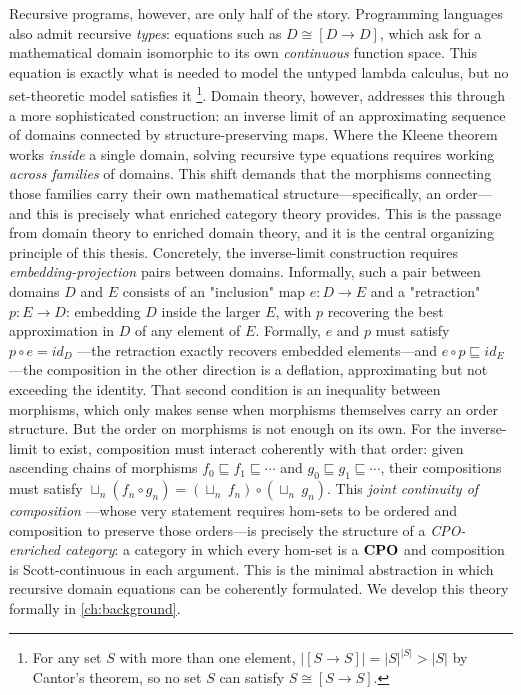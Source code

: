 Recursive programs, however, are only half of the story. Programming languages also admit recursive \textit{types}:
equations such as $D \cong [D \to D]$, which ask for a mathematical domain isomorphic to its own \textit{continuous}
function space. This equation is exactly what is needed to model the untyped lambda calculus, but no set-theoretic model satisfies it
\footnote{For any set $S$ with more than one element, $\left|[S \to S]\right| = |S|^{|S|} > |S|$ by Cantor's theorem, 
so no set $S$ can satisfy $S \cong [S \to S]$.}.
Domain theory, however, addresses this through a more
sophisticated construction: an inverse limit of an approximating sequence of 
domains connected by structure-preserving maps. Where the Kleene theorem works \textit{inside} a single domain, solving
recursive type equations requires working \textit{across families} of domains. This shift demands that the morphisms 
connecting those families carry their own mathematical structure---specifically, an order---and this is precisely what 
enriched category theory provides. This is the passage from domain theory to enriched domain theory, and it is the central 
organizing principle of this thesis. Concretely, the inverse-limit construction requires
\textit{embedding-projection} pairs between domains. Informally, such a pair between domains $D$ and $E$ consists of
an "inclusion" map $e : D \to E$ and a "retraction" $p : E \to D$: embedding $D$ inside the larger $E$, 
with $p$ recovering the best approximation in $D$ of any element of $E$. Formally, $e$ and $p$ must satisfy $p \circ e = id_{D}$ 
---the retraction exactly recovers embedded elements---and $e \circ p \sqsubseteq id_{E}$---the composition in the other 
direction is a deflation, approximating but not exceeding the identity. That second condition is an inequality between 
morphisms, which only makes sense when morphisms themselves carry an order structure. But the order on morphisms is not enough on 
its own. For the inverse-limit to exist, composition must interact coherently with that order: given ascending chains of morphisms 
$f_{0} \sqsubseteq f_{1} \sqsubseteq \cdots$ and $g_{0} \sqsubseteq g_{1} \sqsubseteq \cdots$, their compositions must satisfy
$\sqcup_{n}(f_{n} \circ g_{n}) = (\sqcup_{n} \: f_{n}) \circ (\sqcup_{n} \: g_{n})$. This \emph{joint continuity of composition}
---whose very statement requires hom-sets to be ordered and composition to preserve those orders---is precisely the structure of a 
\textit{CPO-enriched category}: a category in which every hom-set is a $\mathbf{CPO}$ and composition is Scott-continuous in each argument. This
is the minimal abstraction in which recursive domain equations can be coherently formulated. We develop this theory formally in 
\cref{ch:background}.

